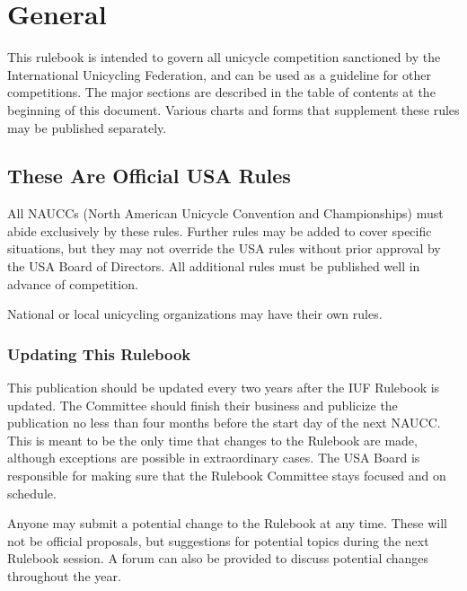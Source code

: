 \chapter{General}
This rulebook is intended to govern all unicycle competition sanctioned by the International Unicycling Federation, and can be used as a guideline for other competitions.
The major sections are described in the table of contents at the beginning of this document.
Various charts and forms that supplement these rules may be published separately. 

\section{These Are Official USA Rules}
All NAUCCs (North American Unicycle Convention and Championships) must abide exclusively by these rules.
Further rules may be added to cover specific situations, but they may not override the USA rules without prior approval by the USA Board of Directors.
All additional rules must be published well in advance of competition.

National or local unicycling organizations may have their own rules.

\subsection{Updating This Rulebook}
This publication should be updated every two years after the IUF Rulebook is updated.
The Committee should finish their business and publicize the publication no less than four months before the start day of the next NAUCC.
This is meant to be the only time that changes to the Rulebook are made, although exceptions are possible in extraordinary cases.
The USA Board is responsible for making sure that the Rulebook Committee stays focused and on schedule.

Anyone may submit a potential change to the Rulebook at any time.
These will not be official proposals, but suggestions for potential topics during the next Rulebook session.
A forum can also be provided to discuss potential changes throughout the year.

